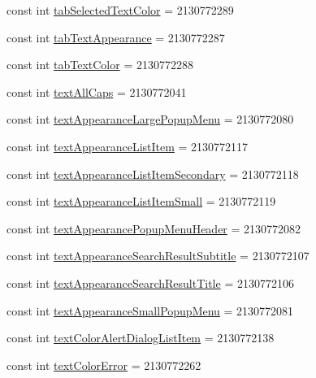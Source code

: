 \begin{CompactItemize}
\item 
const int \hyperlink{class__2doo_1_1_droid_1_1_resource_1_1_attribute_49b285a48055dc874846c6d5f62e5bfe}{tabSelectedTextColor} = 2130772289
\item 
const int \hyperlink{class__2doo_1_1_droid_1_1_resource_1_1_attribute_f8ff6cb0f4d70b6b8b98dcefe38c6de4}{tabTextAppearance} = 2130772287
\item 
const int \hyperlink{class__2doo_1_1_droid_1_1_resource_1_1_attribute_2eb5ad0120f58051ab8c55a6b4e6a060}{tabTextColor} = 2130772288
\item 
const int \hyperlink{class__2doo_1_1_droid_1_1_resource_1_1_attribute_e1bee6c9b1ebf43d6c5d3bcfd7dd7728}{textAllCaps} = 2130772041
\item 
const int \hyperlink{class__2doo_1_1_droid_1_1_resource_1_1_attribute_af2095993dcce62596fb6f3c269ebb80}{textAppearanceLargePopupMenu} = 2130772080
\item 
const int \hyperlink{class__2doo_1_1_droid_1_1_resource_1_1_attribute_396e1a42443df2f61589223d74b7c4c0}{textAppearanceListItem} = 2130772117
\item 
const int \hyperlink{class__2doo_1_1_droid_1_1_resource_1_1_attribute_1ed27f0ffeb9e2a109ad103c7d51978c}{textAppearanceListItemSecondary} = 2130772118
\item 
const int \hyperlink{class__2doo_1_1_droid_1_1_resource_1_1_attribute_f7ef606006ff6f24e75e2f406f211488}{textAppearanceListItemSmall} = 2130772119
\item 
const int \hyperlink{class__2doo_1_1_droid_1_1_resource_1_1_attribute_11cb66e7c4ce63142920250f95b653e9}{textAppearancePopupMenuHeader} = 2130772082
\item 
const int \hyperlink{class__2doo_1_1_droid_1_1_resource_1_1_attribute_26bef0c1e6aa237392ed10d9f4592f27}{textAppearanceSearchResultSubtitle} = 2130772107
\item 
const int \hyperlink{class__2doo_1_1_droid_1_1_resource_1_1_attribute_86fe50b8abab265ef49678f49e6fa516}{textAppearanceSearchResultTitle} = 2130772106
\item 
const int \hyperlink{class__2doo_1_1_droid_1_1_resource_1_1_attribute_2e72ad47732865edf6319a38b6779182}{textAppearanceSmallPopupMenu} = 2130772081
\item 
const int \hyperlink{class__2doo_1_1_droid_1_1_resource_1_1_attribute_6ed8ed055cc74feca7fb749aed11271d}{textColorAlertDialogListItem} = 2130772138
\item 
const int \hyperlink{class__2doo_1_1_droid_1_1_resource_1_1_attribute_09266a22ebc611b3edc1fdf4fd31cf89}{textColorError} = 2130772262

\end{CompactItemize}
